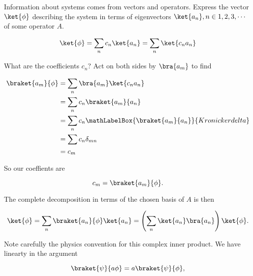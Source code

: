 %
%
%

Information about systems comes from vectors and operators.  Express the vector $\ket{\phi}$ describing the system in terms of eigenvectors $\ket{a_n}, n \in 1,2,3,\cdots$ of some operator $A$.

\begin{equation}\label{eqn:PHY356FLecture10:51}
\ket{\phi} = \sum_n c_n \ket{a_n} = \sum_n \ket{c_n a_n}
\end{equation}

What are the coefficients $c_n$?  Act on both sides by $\bra{a_m}$ to find

\begin{equation}\label{eqn:lecture5BigReviewCh1Formalism:71}
\begin{aligned}
\braket{a_m}{\phi}
&= \sum_n \bra{a_m} \ket{ c_n a_n } \\
&= \sum_n c_n \braket{a_m}{ a_n } \\
&= \sum_n c_n 
\mathLabelBox{\braket{a_m}{a_n}}{Kronicker delta}
\\
&= \sum c_n \delta_{mn} \\
&= c_m
\end{aligned}
\end{equation}

So our coeffients are

\begin{equation}\label{eqn:PHY356FLecture10:51c}
c_m = \braket{a_m}{\phi}.
\end{equation}

The complete decomposition in terms of the chosen basis of $A$ is then

\begin{equation}\label{eqn:PHY356FLecture10:51b}
\ket{\phi} = \sum_n \braket{a_n}{\phi} \ket{a_n}
= \left( \sum_n \ket{a_n} \bra{a_n} \right) \ket{\phi}.
\end{equation}

Note carefully the physics convention for this complex inner product.  We have linearty in the  argument

\begin{equation}\label{eqn:PHY356FLecture10:51e}
\braket{\psi}{a \phi} = a \braket{\psi}{\phi},
\end{equation}

